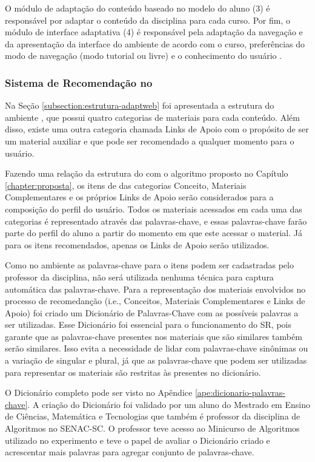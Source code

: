 O módulo de adaptação do conteúdo baseado no modelo do aluno (3) é responsável por adaptar o conteúdo da disciplina
para cada curso. Por fim, o módulo de interface adaptativa (4) é responsável pela adaptação da navegação e da
apresentação da interface do ambiente de acordo com o curso, preferências do modo de navegação (modo tutorial ou livre)
e o conhecimento do usuário \cite{gasparini2003interface}.

\subsubsection{Sistema de Recomendação no \adaptweb}

Na Seção \ref{subsection:estrutura-adaptweb} foi apresentada a estrutura do ambiente \adaptweb, que possui quatro categorias
de materiais para cada conteúdo. Além disso, existe uma outra categoria chamada Links de Apoio com o propósito de ser um
material auxiliar e que pode ser recomendado a qualquer momento para o usuário.

Fazendo uma relação da estrutura do \adaptwebspace com o algoritmo proposto no Capítulo \ref{chapter:proposta}, os itens de
das categorias Conceito, Materiais Complementares e os próprios Links de Apoio serão considerados para a composição do perfil do usuário. Todos os
materiais acessados em cada uma das categorias é representado através das palavras-chave, e
essas palavras-chave farão parte do perfil do aluno a partir do momento em que este acessar o material. Já para os itens
recomendados, apenas os Links de Apoio serão utilizados.

Como no ambiente \adaptwebspace as palavras-chave para o itens podem ser cadastradas pelo professor da disciplina, não será
utilizada nenhuma técnica para captura automática das palavras-chave. Para a representação dos materiais envolvidos no
processo de recomedanção (i.e., Conceitos, Materiais Complementares e Links de Apoio) foi criado um Dicionário de Palavras-Chave
com as possíveis palavras a ser utilizadas. Esse Dicionário foi essencial para o funcionamento do SR, pois garante que as
palavras-chave presentes nos materiais que são similares também serão similares. Isso evita a necessidade de lidar com palavras-chave
sinônimas ou a variação de singular e plural, já que as palavras-chave que podem ser utilizadas para representar os materiais
são restritas às presentes no dicionário.

O Dicionário completo pode ser visto no Apêndice \ref{ape:dicionario-palavras-chave}. A criação do Dicionário foi validado
por um aluno do Mestrado em Ensino de Ciências, Matemática e Tecnologias que também é professor da disciplina de
Algoritmos no SENAC-SC. O professor teve acesso ao Minicurso de Algoritmos utilizado no experimento
e teve o papel de avaliar o Dicionário criado e acrescentar mais palavras para agregar conjunto de palavras-chave.

